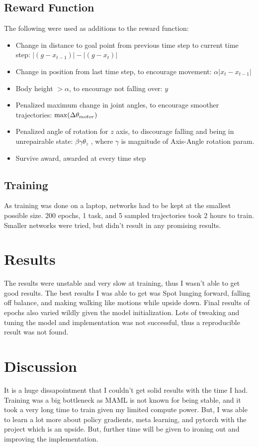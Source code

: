 \documentclass{scrartcl}
\theoremstyle{definition}
\theoremstyle{note}
\begin{document}
\subsection{Reward Function}
The following were used as additions to the reward function:
\begin{itemize}
    \item Change in distance to goal point from previous time step to current time step: $ |(g - x_{t-1})| - |(g - x_t)| $ 
    \item Change in position from last time step, to encourage movement: $ \alpha|x_t - x_{t-1}| $
    \item Body height $ > \alpha$, to encourage not falling over: $ y $ 
    \item Penalized maximum change in joint angles, to encourage smoother trajectories: $ \max (\Delta \theta_{\scriptsize motor}) $ 
    \item Penalized angle of rotation for $ z $ axis, to discourage falling and being in unrepairable state: $ \beta \gamma \theta_z  $ , where $ \gamma $ is magnitude of Axis-Angle rotation param.
    \item Survive award, awarded at every time step
\end{itemize}

\subsection{Training}
As training was done on a laptop, networks had to be kept at the smallest possible size. 200 epochs,
1 task, and 5 sampled trajectories took 2 hours to train. Smaller networks were tried, but didn't result in any
promising results.

\section{Results}
The results were unstable and very slow at training, thus I wasn't able to get good results.
The best results I was able to get was Spot lunging forward, falling off balance, and making walking like motions 
while upside down. Final results of epochs also varied wildly given the model initialization.
Lots of tweaking and tuning the model and implementation was not successful, thus a reproducible result was not found. 


\section{Discussion}
It is a huge dissapointment that I couldn't get solid results with the time I had. Training was a big bottleneck as 
MAML is not known for being stable, and it took a very long time to train given my limited compute power.
But, I was able to learn a lot more about policy gradients, meta learning, and pytorch with the project which is an upside.
But, further time will be given to ironing out and improving the implementation.
\end{document}
